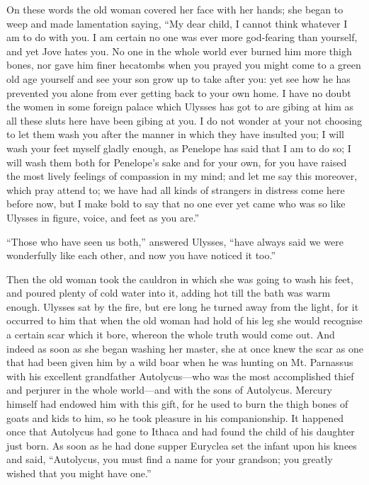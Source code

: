 On these words the old woman covered her face with her hands; she began to weep
and made lamentation saying, “My dear child, I cannot think whatever I am to do
with you. I am certain no one was ever more god-fearing than yourself, and yet
Jove hates you. No one in the whole world ever burned him more thigh bones, nor
gave him finer hecatombs when you prayed you might come to a green old age
yourself and see your son grow up to take after you: yet see how he has
prevented you alone from ever getting back to your own home. I have no doubt
the women in some foreign palace which Ulysses has got to are gibing at him as
all these sluts here have been gibing at you. I do not wonder at your not
choosing to let them wash you after the manner in which they have insulted you;
I will wash your feet myself gladly enough, as Penelope has said that I am to
do so; I will wash them both for Penelope’s sake and for your own, for you have
raised the most lively feelings of compassion in my mind; and let me say this
moreover, which pray attend to; we have had all kinds of strangers in distress
come here before now, but I make bold to say that no one ever yet came who was
so like Ulysses in figure, voice, and feet as you are.”

“Those who have seen us both,” answered Ulysses, “have always said we were
wonderfully like each other, and now you have noticed it too.”

Then the old woman took the cauldron in which she was going to wash his feet,
and poured plenty of cold water into it, adding hot till the bath was warm
enough. Ulysses sat by the fire, but ere long he turned away from the light,
for it occurred to him that when the old woman had hold of his leg she would
recognise a certain scar which it bore, whereon the whole truth would come out.
And indeed as soon as she began washing her master, she at once knew the scar
as one that had been given him by a wild boar when he was hunting on Mt.
Parnassus with his excellent grandfather Autolycus—who was the most
accomplished thief and perjurer in the whole world—and with the sons of
Autolycus. Mercury himself had endowed him with this gift, for he used to burn
the thigh bones of goats and kids to him, so he took pleasure in his
companionship. It happened once that Autolycus had gone to Ithaca and had found
the child of his daughter just born. As soon as he had done supper Euryclea set
the infant upon his knees and said, “Autolycus, you must find a name for your
grandson; you greatly wished that you might have one.”

